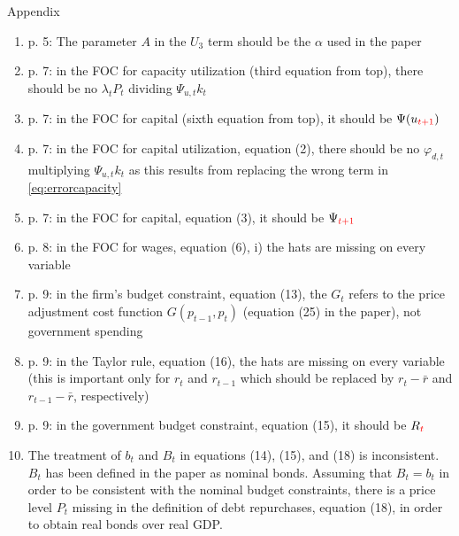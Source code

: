 \documentclass[11pt,a4paper]{article}
\begin{document}
Appendix
\begin{enumerate}
  \item p. 5: The parameter $A$ in the $U_3$ term should be the $\alpha$ used in the paper
  \item \label{eq:errorcapacity} p. 7: in the FOC for capacity utilization (third equation from top), there should be no $\lambda_tP_t$ dividing $\Psi_{u,t}k_t$
  \item p. 7: in the FOC for capital (sixth equation from top), it should be $\Psi(u_{\textcolor{red}{t+1}})$
  \item p. 7: in the FOC for capital utilization, equation (2), there should be no $\varphi_{d,t}$ multiplying $\Psi_{u,t}k_t$ as this results from replacing the wrong term in \ref{eq:errorcapacity}
  \item p. 7: in the FOC for capital, equation (3), it should be $\Psi_{\textcolor{red}{t+1}}$
  \item p. 8: in the FOC for wages, equation (6), i) the hats are missing on every variable
  \item p. 9: in the firm's budget constraint, equation (13), the $G_t$ refers to the price adjustment cost function $G(p_{t-1},p_t)$ (equation (25) in the paper), not government spending
  \item p. 9: in the Taylor rule, equation (16), the hats are missing on every variable (this is important only for $r_t$ and $r_{t-1}$ which should be replaced by $r_t-\bar r$ and $r_{t-1}-\bar r$, respectively)
  \item p. 9: in the government budget constraint, equation (15), it should be  $R_{\textcolor{red}{t}}$
  \item The treatment of $b_t$ and $B_t$ in equations (14), (15), and (18) is inconsistent. $B_t$ has been defined in the paper as nominal bonds. Assuming that $B_t=b_t$ in order to be consistent with the nominal budget constraints, there is a price level $P_t$ missing in the definition of debt repurchases, equation (18), in order to obtain real bonds over real GDP.
\end{enumerate}
\end{document}
